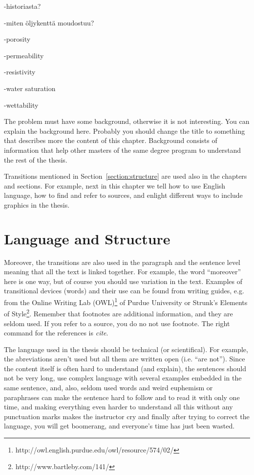 \documentclass[12pt,a4paper,oneside,pdftex]{report}
\begin{document}
-historiasta?

-miten öljykenttä moudostuu?

-porosity

-permeability

-resistivity

-water saturation

-wettability


The problem must have some background, otherwise it is not
interesting. You can explain the background here. Probably you should
change the title to something that describes more the content of this
chapter. Background consists of information that help other masters of
the same degree program to understand the rest of the thesis.

Transitions mentioned in Section~\ref{section:structure} are used also
in the chapters and sections. For example, next in this chapter we
tell how to use English language, how to find and refer to sources,
and enlight different ways to include graphics in the thesis.

\section{Language and Structure}

Moreover, the transitions are also used in the paragraph and the
sentence level meaning that all the text is linked together. For example,
the word ``moreover'' here is one way, but of course you should use
variation in the text. Examples of transitional devices (words) and
their use can be found from writing guides, e.g. from the Online
Writing Lab
(OWL)\footnote{http://owl.english.purdue.edu/owl/resource/574/02/} of
Purdue University or Strunk's Elements of
Style\footnote{http://www.bartleby.com/141/}. Remember that footnotes
are additional information, and they are seldom used. If you refer to a source, you do no
not use footnote. The right command for the references is \emph{cite}.

The language used in the thesis should be technical (or
scientifical). For example, the abreviations aren't used but all them
are written open (i.e. ``are not''). Since the content itself is often
hard to understand (and explain), the sentences should not be very
long, use complex language with several examples embedded in the same
sentence, and, also, seldom used words and weird euphemism or paraphrases
can make the sentence hard to follow and to read it with only one
time, and making everything even harder to understand all this without
any punctuation marks makes the instructor cry and finally after
trying to correct the language, you will get boomerang, and everyone's
time has just been wasted.
\end{document}
